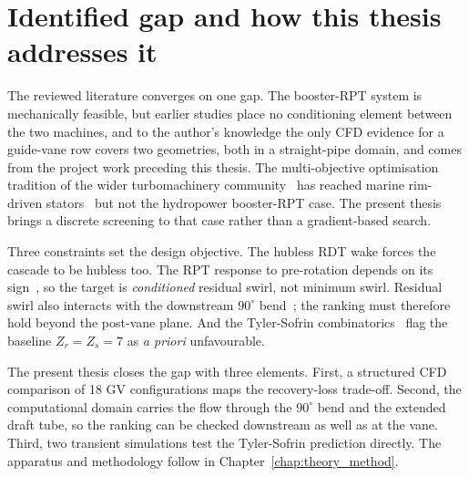 \section{Identified gap and how this thesis addresses it}
\label{sec:lit_gap}

The reviewed literature converges on one gap. The booster-RPT system is mechanically feasible, but earlier studies place no conditioning element between the two machines, and to the author's knowledge the only CFD evidence for a guide-vane row covers two geometries, both in a straight-pipe domain, and comes from the project work preceding this thesis. The multi-objective optimisation tradition of the wider turbomachinery community~\cite{Vasilopoulos2019, Schnoes2018} has reached marine rim-driven stators~\cite{GaggeroMartinelli2024} but not the hydropower booster-RPT case. The present thesis brings a discrete screening to that case rather than a gradient-based search.

Three constraints set the design objective. The hubless RDT wake forces the cascade to be hubless too. The RPT response to pre-rotation depends on its sign~\cite{Larsen2019, Jenssen2020}, so the target is \emph{conditioned} residual swirl, not minimum swirl. Residual swirl also interacts with the downstream $90^\circ$ bend~\cite{KalpakliOrlu2013}; the ranking must therefore hold beyond the post-vane plane. And the Tyler-Sofrin combinatorics~\cite{Tyler1962} flag the baseline $Z_r = Z_s = 7$ as \emph{a priori} unfavourable.

The present thesis closes the gap with three elements. First, a structured CFD comparison of 18 GV configurations maps the recovery-loss trade-off. Second, the computational domain carries the flow through the $90^\circ$ bend and the extended draft tube, so the ranking can be checked downstream as well as at the vane. Third, two transient simulations test the Tyler-Sofrin prediction directly. The apparatus and methodology follow in Chapter~\ref{chap:theory_method}.
